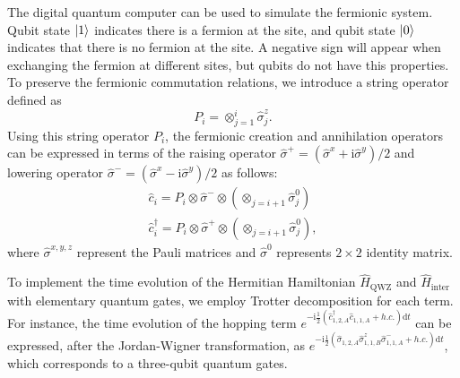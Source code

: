 \documentclass[longbibliography, aps, prx, amsmath, amssymb, amsfonts, twocolumn,superscriptaddress, footinbib]{revtex4-1}
\begin{document}
	The digital quantum computer can be used to simulate the fermionic system. 
	Qubit state $\ket{1}$ indicates there is a fermion at the site, and qubit state $\ket{0}$ indicates that there is no fermion at the site. 
	A negative sign will appear when exchanging the fermion at different sites, but qubits do not have this properties. 
	To preserve the fermionic commutation relations, we introduce a string operator defined as
	\begin{equation}
		P_i = \otimes_{j=1}^i\hat{\sigma}^z_j.
	\end{equation}
	Using this string operator $P_i$, the fermionic creation and annihilation operators can be expressed in terms of the raising operator $\hat{\sigma}^+=(\hat{\sigma}^x+\mathrm{i}\hat{\sigma}^y)/2$ and lowering operator $\hat{\sigma}^-=(\hat{\sigma}^x-\mathrm{i}\hat{\sigma}^y)/2$ as follows:
	\begin{equation}
		\begin{split}
			\hat{c}_i = P_i \otimes \hat{\sigma}^{-}\otimes (\otimes_{j=i+1}\hat{\sigma}^0_j)\\
			\hat{c}_i^{\dagger} = P_i \otimes \hat{\sigma}^{+}\otimes (\otimes_{j=i+1}\hat{\sigma}^0_j),
		\end{split}
	\end{equation}
	where $\hat{\sigma}^{x,y,z}$ represent the Pauli matrices and $\hat{\sigma}^0$ represents $2\times 2$ identity matrix.

	To implement the time evolution of the Hermitian Hamiltonian $\hat{H}_{\text{QWZ}}$ and $\hat{H}_{\text{inter}}$ with elementary quantum gates, we employ Trotter decomposition for each term. For instance, the time evolution of the hopping term $e^{-\mathrm{i} \frac{1}{2} (\hat{c}_{1,2,A}^{\dagger} \hat{c}_{1,1,A} +h.c.)\mathrm{d} t}$ can be expressed, after the Jordan-Wigner transformation, as $e^{-\mathrm{i} \frac{1}{2} (\hat{\sigma}_{1,2,A} \hat{\sigma}^z_{1,1,B}\hat{\sigma}_{1,1,A}^{-} +h.c.)\mathrm{d} t}$, which corresponds to a three-qubit quantum gates.
	
\end{document}
